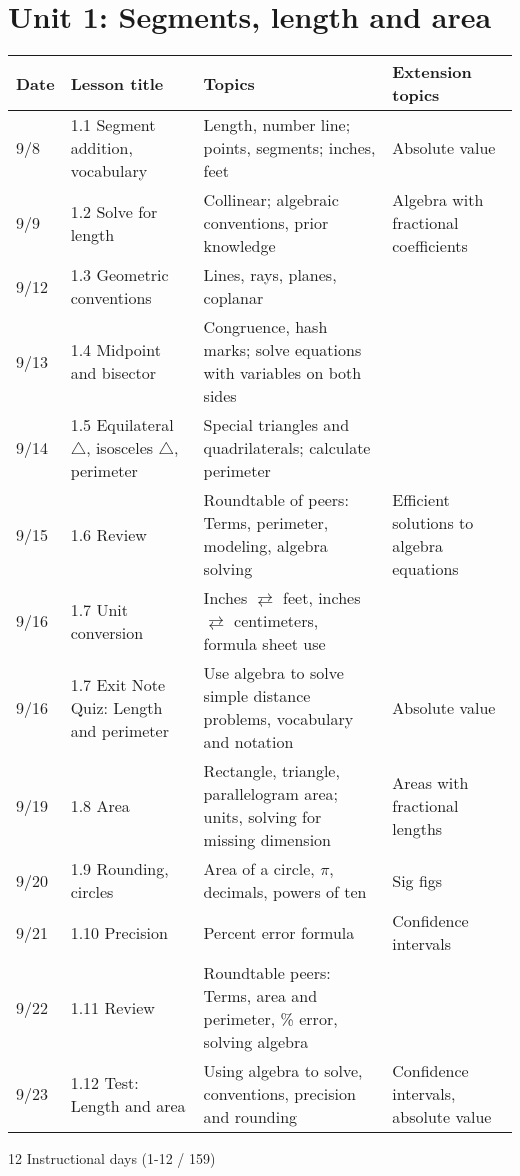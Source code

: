 

\geometry{hoffset=-0.5in, textwidth=7.5in}

\fancyhead[RE]{\thepage}
\fancyhead[RO]{\thepage }%



\section*{Unit 1: Segments, length and area}
\begin{tabular}{|p{0.9cm}|p{4cm}|p{7cm}|p{5cm}|}
  \hline
  Date & Lesson title & Topics  & Extension topics \\
  \hline
  9/8 & 1.1 Segment addition, vocabulary & Length, number line; points, segments; inches, feet & Absolute value \\
  \hline
  9/9 & 1.2 Solve for length & Collinear; algebraic conventions, prior knowledge & Algebra with fractional coefficients \\
  \hline
  9/12 & 1.3 Geometric conventions & Lines, rays, planes, coplanar &  \\
  \hline
  9/13 & 1.4 Midpoint and bisector & Congruence, hash marks; solve equations with variables on both sides &  \\
  \hline
  9/14 & 1.5 Equilateral $\triangle$, isosceles $\triangle$, perimeter & Special triangles and quadrilaterals; calculate perimeter &  \\
  \hline
  9/15 & 1.6 Review & Roundtable of peers: Terms, perimeter, modeling, algebra solving & Efficient solutions to algebra equations \\
  \hline
  9/16 & 1.7 Unit conversion & Inches $\rightleftarrows$ feet, inches $\rightleftarrows$ centimeters, formula sheet use &  \\
  \hline
  9/16 & 1.7 Exit Note Quiz: Length and perimeter & Use algebra to solve simple distance problems, vocabulary and notation & Absolute value \\
  \hline
  9/19 & 1.8 Area & Rectangle, triangle, parallelogram area; units, solving for missing dimension & Areas with fractional lengths \\
  \hline
  9/20 & 1.9 Rounding, circles & Area of a circle, $\pi$, decimals, powers of ten & Sig figs \\
  \hline
  9/21 & 1.10 Precision & Percent error formula & Confidence intervals \\
  \hline
  9/22 & 1.11 Review & Roundtable peers: Terms, area and perimeter, \% error, solving algebra & \\
  \hline
  9/23 & 1.12 Test: Length and area & Using algebra to solve, conventions, precision and rounding & Confidence intervals, absolute value \\
  \hline

\end{tabular} \par \vspace*{0.3cm}
12 Instructional days (1-12 / 159)

